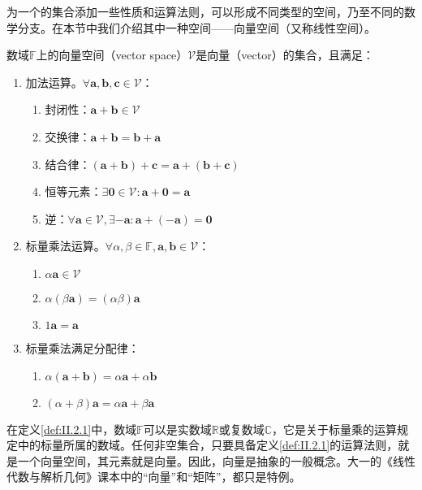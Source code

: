 \documentclass[main.tex]{subfiles}
\begin{document}
为一个的集合添加一些性质和运算法则，可以形成不同类型的空间，乃至不同的数学分支。在本节中我们介绍其中一种空间——向量空间（又称线性空间\cite{周胜林2012线性代数}）。

\begin{definition}[向量空间]\label{def:II.2.1}
数域$\mathbb{F}$上的向量空间（vector space）$\mathcal{V}$是向量（vector）的集合，且满足：
\begin{enumerate}
\item 加法运算。$\forall\mathbf{a},\mathbf{b},\mathbf{c}\in \mathcal{V}$：
\begin{enumerate}
    \item 封闭性：$\mathbf{a}+\mathbf{b}\in\mathcal{V}$
    \item 交换律：$\mathbf{a}+\mathbf{b}=\mathbf{b}+\mathbf{a}$
    \item 结合律：$\left(\mathbf{a}+\mathbf{b}\right)+\mathbf{c}=\mathbf{a}+\left(\mathbf{b}+\mathbf{c}\right)$
    \item 恒等元素：$\exists \bm{0}\in\mathcal{V}:\mathbf{a}+\bm{0}=\mathbf{a}$
    \item 逆：$\forall \mathbf{a}\in\mathcal{V},\exists -\mathbf{a}:\mathbf{a}+\left(-\mathbf{a}\right)=\bm{0}$
\end{enumerate}
\item 标量乘法运算。$\forall\alpha,\beta\in\mathbb{F},\mathbf{a},\mathbf{b}\in\mathcal{V}$：
\begin{enumerate}
    \item $\alpha\mathbf{a}\in\mathcal{V}$
    \item $\alpha\left(\beta\mathbf{a}\right)=\left(\alpha\beta\right)\mathbf{a}$
    \item $1\mathbf{a}=\mathbf{a}$
\end{enumerate}
\item 标量乘法满足分配律：
\begin{enumerate}
    \item $\alpha\left(\mathbf{a}+\mathbf{b}\right)=\alpha\mathbf{a}+\alpha\mathbf{b}$
    \item $\left(\alpha+\beta\right)\mathbf{a}=\alpha\mathbf{a}+\beta\mathbf{a}$
\end{enumerate}
\end{enumerate}
\end{definition}

在定义\ref{def:II.2.1}中，数域$\mathbb{F}$可以是实数域$\mathbb{R}$或复数域$\mathbb{C}$，它是关于标量乘的运算规定中的标量所属的数域。任何非空集合，只要具备定义\ref{def:II.2.1}的运算法则，就是一个向量空间，其元素就是向量。因此，向量是抽象的一般概念。大一的《线性代数与解析几何》课本中的“向量”和“矩阵”，都只是特例。
\end{document}
